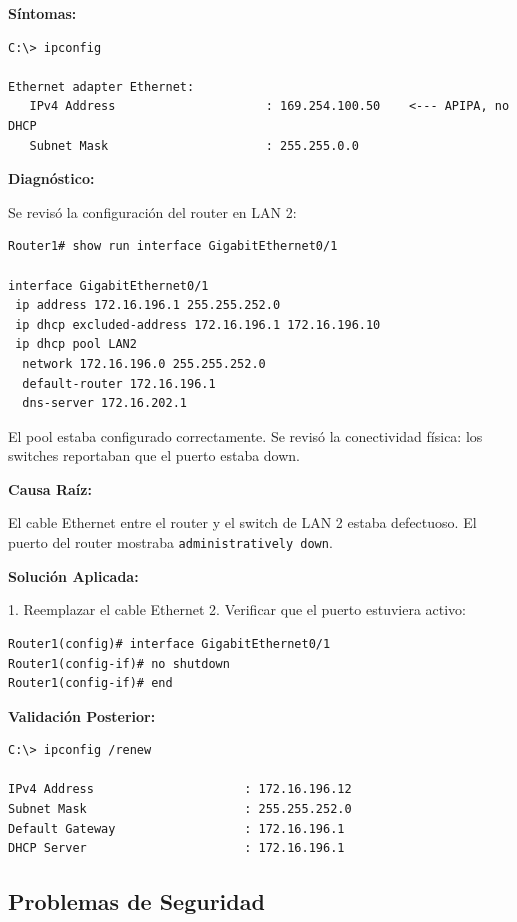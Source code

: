 \textbf{Síntomas:}

\begin{verbatim}
C:\> ipconfig

Ethernet adapter Ethernet:
   IPv4 Address                     : 169.254.100.50    <--- APIPA, no DHCP
   Subnet Mask                      : 255.255.0.0
\end{verbatim}

\textbf{Diagnóstico:}

Se revisó la configuración del router en LAN 2:

\begin{verbatim}
Router1# show run interface GigabitEthernet0/1

interface GigabitEthernet0/1
 ip address 172.16.196.1 255.255.252.0
 ip dhcp excluded-address 172.16.196.1 172.16.196.10
 ip dhcp pool LAN2
  network 172.16.196.0 255.255.252.0
  default-router 172.16.196.1
  dns-server 172.16.202.1
\end{verbatim}

El pool estaba configurado correctamente. Se revisó la conectividad física:
los switches reportaban que el puerto estaba down.

\textbf{Causa Raíz:}

El cable Ethernet entre el router y el switch de LAN 2 estaba
defectuoso. El puerto del router mostraba \texttt{administratively down}.

\textbf{Solución Aplicada:}

1. Reemplazar el cable Ethernet
2. Verificar que el puerto estuviera activo:

\begin{verbatim}
Router1(config)# interface GigabitEthernet0/1
Router1(config-if)# no shutdown
Router1(config-if)# end
\end{verbatim}

\textbf{Validación Posterior:}

\begin{verbatim}
C:\> ipconfig /renew

IPv4 Address                     : 172.16.196.12
Subnet Mask                      : 255.255.252.0
Default Gateway                  : 172.16.196.1
DHCP Server                      : 172.16.196.1
\end{verbatim}


\subsection{Problemas de Seguridad}

